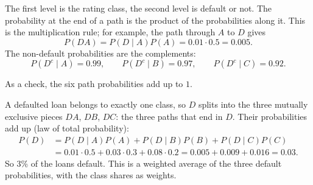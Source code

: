 \begin{solution}
	 The first level is the rating class, the second level is
	default or not. The probability at the end of a path is the product of the
	probabilities along it. This is the multiplication rule; for example, the
	path through $A$ to $D$ gives
	\[ P(DA)=P(D\mid A)P(A)=0.01\cdot0.5=0.005. \]
	The non-default probabilities are the complements:
	\[ P(D^c\mid A)=0.99,\qquad P(D^c\mid B)=0.97,\qquad P(D^c\mid C)=0.92. \]
	\begin{center}
	\end{center}
	As a check, the six path probabilities add up to $1$.

	 A defaulted loan belongs to exactly one class, so $D$ splits
	into the three mutually exclusive pieces $DA$, $DB$, $DC$: the three paths
	that end in $D$. Their probabilities add up (law of total probability):
	\[ \begin{aligned}
			P(D) & =P(D\mid A)P(A)+P(D\mid B)P(B)+P(D\mid C)P(C) \\
			     & =0.01\cdot0.5+0.03\cdot0.3+0.08\cdot0.2
			=0.005+0.009+0.016=0.03.
		\end{aligned} \]
	So 3\% of the loans default. This is a weighted average of the three
	default probabilities, with the class shares as weights.


\end{solution}
